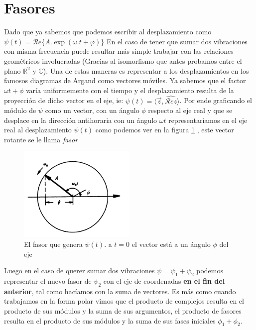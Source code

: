 \documentclass[a4paper,spanish]{article}
\def\Rea {\mathcal{R}e}
\def\C {\mathbb{C}}
\def\R {\mathbb{R}}
\numberwithin{equation}{section}
\begin{document}
\section{Fasores}

Dado que ya sabemos que podemos escribir al desplazamiento como $\psi (t) =
\Rea \lbrace{A. \exp(\omega .t + \varphi )}\rbrace$ En el caso de tener que sumar dos vibraciones con misma frecuencia puede resultar m\'as simple trabajar con las relaciones geom\'etricos involucradas (Gracias al isomorfismo que antes probamos entre el plano $\R^2$ y $\C$). Una de estas maneras es representar a los desplazamientos en los famosos diagramas de Argand como vectores m\'oviles. Ya sabemos que el factor $\omega t + \phi$ var\'ia uniformemente con el tiempo y el desplazamiento resulta de la proyecci\'on de dicho vector en el eje, ie: $\psi(t)=\langle\vec{z},\widehat{\Rea {z}}\rangle$. 	Por ende graficando el m\'odulo de $\psi$ como un vector, con un \'angulo $\phi$ respecto al eje real y que se desplace en la direcci\'on antihoraria con un \'angulo $\omega t$ representar\'iamos en el eje real al desplazamiento $\psi(t)$ como podemos ver en la figura \ref{Fasor} , este vector rotante se le llama \textit{fasor}

\begin{figure}[h!]
  \centering
    \includegraphics[width=0.5\textwidth]{Imagenes/Fasor.png}
  \caption{El fasor que genera $\psi(t)$. a $t=0$ el vector est\'a a un \'angulo $\phi$ del eje}
  \label{Fasor}
\end{figure}

Luego en el caso de querer sumar dos vibraciones $\psi = \psi_1 + \psi_2$ podemos representar el nuevo fasor de $\psi_2$ con el eje de coordenadas \textbf{en el fin del anterior}, tal como hac\'iamos con la suma de vectores. Es m\'as como cuando trabajamos en la forma polar vimos que el producto de complejos resulta en el producto de sus  m\'odulos y la suma de sus argumentos, el producto de fasores resulta en el producto de sus m\'odulos y la suma de sus fases iniciales $\phi_1+\phi_2$. 
\end{document}
